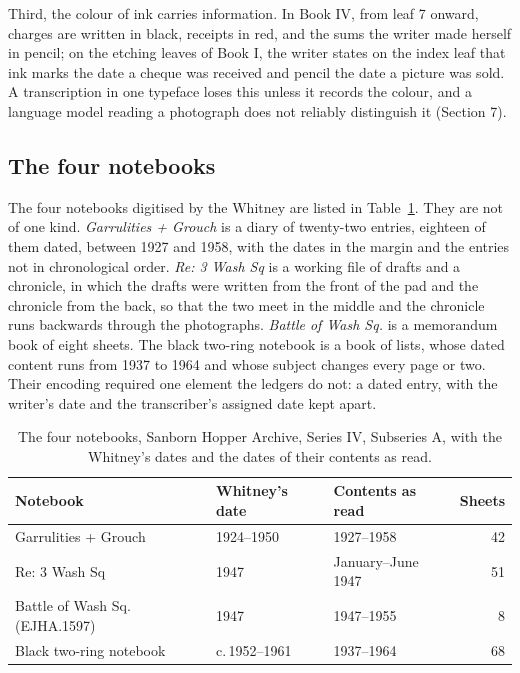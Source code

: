 \documentclass[11pt]{article}
\begin{document}
Third, the colour of ink carries information. In Book IV, from leaf 7 onward, charges are written in black, receipts in red, and the sums the writer made herself in pencil; on the etching leaves of Book I, the writer states on the index leaf that ink marks the date a cheque was received and pencil the date a picture was sold. A transcription in one typeface loses this unless it records the colour, and a language model reading a photograph does not reliably distinguish it (Section 7).

\subsection{The four notebooks}

The four notebooks digitised by the Whitney are listed in Table~\ref{tab:notebooks}. They are not of one kind. \emph{Garrulities + Grouch} is a diary of twenty-two entries, eighteen of them dated, between 1927 and 1958, with the dates in the margin and the entries not in chronological order. \emph{Re: 3 Wash Sq} is a working file of drafts and a chronicle, in which the drafts were written from the front of the pad and the chronicle from the back, so that the two meet in the middle and the chronicle runs backwards through the photographs. \emph{Battle of Wash Sq.} is a memorandum book of eight sheets. The black two-ring notebook is a book of lists, whose dated content runs from 1937 to 1964 and whose subject changes every page or two. Their encoding required one element the ledgers do not: a dated entry, with the writer's date and the transcriber's assigned date kept apart.

\begin{table}[htbp]\centering\small
\caption{The four notebooks, Sanborn Hopper Archive, Series IV, Subseries A, with the Whitney's dates and the dates of their contents as read.}\label{tab:notebooks}
\begin{tabular}{lllr}\toprule
Notebook & Whitney's date & Contents as read & Sheets\\\midrule
Garrulities + Grouch & 1924--1950 & 1927--1958 & 42\\
Re: 3 Wash Sq & 1947 & January--June 1947 & 51\\
Battle of Wash Sq. (EJHA.1597) & 1947 & 1947--1955 & 8\\
Black two-ring notebook & c.\,1952--1961 & 1937--1964 & 68\\\bottomrule
\end{tabular}
\end{table}
\end{document}
